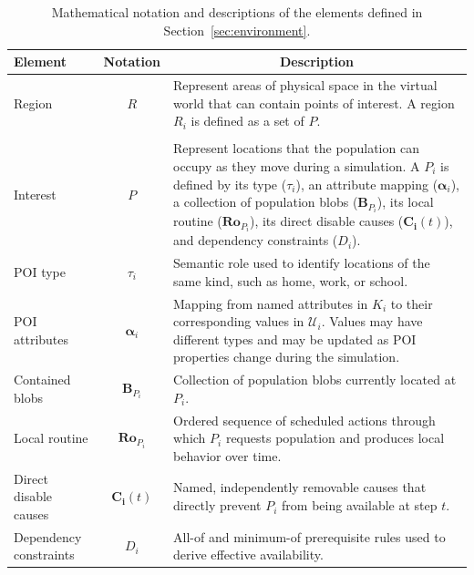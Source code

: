 \begin{table}[ht]
\footnotesize
\centering
\caption{Mathematical notation and descriptions of the elements defined in Section~\ref{sec:environment}.}
\label{tbl:notation_env}
\begin{tabularx}{\linewidth}{@{}lcX@{}}
\toprule
\textbf{Element} & \textbf{Notation} & \multicolumn{1}{c}{\textbf{Description}} \\ \midrule
Region & $R$ & Represent areas of physical space in the virtual world that can contain points of interest. A region $R_i$ is defined as a set of $P$. \\ \midrule
\begin{tabular}[c]{@{}l@{}}Point of\\ Interest\end{tabular} & $P$ & Represent locations that the population can occupy as they move during a simulation. A $P_i$ is defined by its type ($\tau_i$), an attribute mapping ($\bm{\alpha}_i$), a collection of population blobs ($\bm{B}_{P_i}$), its local routine ($\bm{Ro}_{P_i}$), its direct disable causes ($\bm{C_i}(t)$), and dependency constraints ($D_i$). \\ \midrule
POI type & $\tau_i$ & Semantic role used to identify locations of the same kind, such as home, work, or school. \\ \midrule
POI attributes & $\bm{\alpha}_i$ & Mapping from named attributes in $K_i$ to their corresponding values in $\mathcal{U}_i$. Values may have different types and may be updated as POI properties change during the simulation. \\ \midrule
Contained blobs & $\bm{B}_{P_i}$ & Collection of population blobs currently located at $P_i$. \\ \midrule
Local routine & $\bm{Ro}_{P_i}$ & Ordered sequence of scheduled actions through which $P_i$ requests population and produces local behavior over time. \\ \midrule
Direct disable causes & $\bm{C_i}(t)$ & Named, independently removable causes that directly prevent $P_i$ from being available at step $t$. \\ \midrule
Dependency constraints & $D_i$ & All-of and minimum-of prerequisite rules used to derive effective availability. \\ %
\bottomrule
\end{tabularx}
\end{table}

